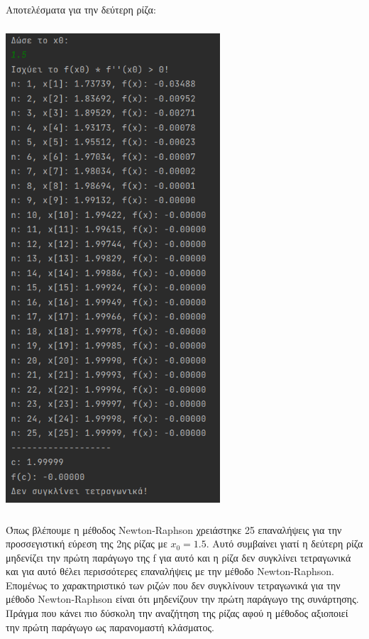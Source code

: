 \documentclass{article}
\begin{document}
\vspace{3mm}
Αποτελέσματα για την δεύτερη ρίζα: \\
\begin{center}\includegraphics[width=8cm, height=18cm]{images/results_4.png} \end{center}
Όπως βλέπουμε η μέθοδος Newton-Raphson χρειάστηκε 25 επαναλήψεις για την προσσεγιστική εύρεση της 2ης ρίζας με \(x_0 = 1.5\). Αυτό συμβαίνει γιατί η δεύτερη ρίζα μηδενίζει την πρώτη παράγωγο της f για αυτό και η ρίζα δεν συγκλίνει τετραγωνικά και για αυτό θέλει περισσότερες επαναλήψεις με την μέθοδο Newton-Raphson. \\

Επομένως το χαρακτηριστικό των ριζών που δεν συγκλίνουν τετραγωνικά για την μέθοδο Newton-Raphson είναι ότι μηδενίζουν την πρώτη παράγωγο της συνάρτησης. Πράγμα που κάνει πιο δύσκολη την αναζήτηση της ρίζας αφού η μέθοδος αξιοποιεί την πρώτη παράγωγο ως παρανομαστή κλάσματος.
\end{document}
